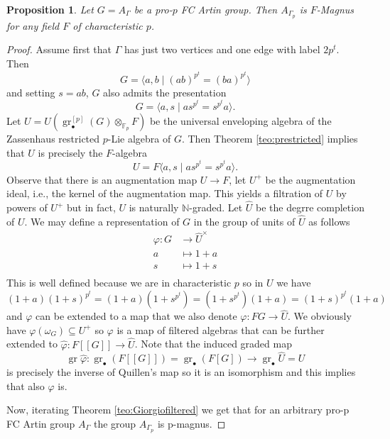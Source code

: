 \documentclass[10pt, oneside]{amsart}
\newcommand{\N}{\mathbb{N}} %
\newcommand{\F}{\mathbb{F}}
\newcommand{\gr}{\operatorname{gr}} %
\newtheorem{proposition}[theorem]{Proposition}
\theoremstyle{definition}
\theoremstyle{remark}
\theoremstyle{plain}
\begin{document}



\begin{proposition}\label{FMagnusArtin}
    Let $G=A_\Gamma$ be a pro-$p$ FC Artin group. Then $A_{\Gamma_p}$ is $F$-Magnus for any field $F$ of characteristic $p$.
\end{proposition}
\begin{proof}  Assume first that $\Gamma$ has just two vertices and one edge with label $2p^t$. Then
$$G=\langle a,b\mid (ab)^{p^t}=(ba)^{p^t}\rangle$$
and setting $s=ab$, $G$ also admits the presentation
$$G=\langle a,s\mid as^{p^t}=s^{p^t}a\rangle.$$
Let $U=U(\gr^{[p]}_\bullet(G)\otimes_{\F_p}F)$ be the universal enveloping algebra of the Zassenhaus restricted $p$-Lie algebra of $G$. Then Theorem \ref{teo:prestricted} implies that $U$ is precisely the $F$-algebra
$$U=F\langle a,s\mid as^{p^t}=s^{p^t}a\rangle.$$
Observe that there is an augmentation map $U\to F$, let $U^+$ be the augmentation ideal, i.e., the kernel of the augmentation map. This yields a filtration of $U$ by powers of $U^+$ but in fact, $U$ is naturally $\N$-graded. Let $\hat{U}$ be the degrre completion of $U$. We may define a representation of $G$ in the group of units of $\hat{U}$ as follows
$$\begin{aligned}
\varphi:G&\to\hat{U}^\times\\
a&\mapsto 1+a\\
s&\mapsto 1+s\\
\end{aligned}$$
This is well defined because we are in characteristic $p$ so in $U$ we have
$$(1+a)(1+s)^{p^t}=(1+a)(1+s^{p^t})=(1+s^{p^t})(1+a)=(1+s)^{p^t}(1+a)$$
and $\varphi$ can be extended to a map that we also denote  $\varphi:FG\to\hat{U}$. We obviously have $\varphi(\omega_G)\subseteq U^+$ so $\varphi$ is a map of filtered algebras that can be further extended to
$\hat{\varphi}:F[[G]]\to\hat{U}$. Note that the induced graded map $$\gr\hat{\varphi}:\gr_\bullet(F[[G]])=\gr_\bullet(F[G])\to\gr_\bullet\hat{U}=U$$
is precisely the inverse of  Quillen's map so it is an isomorphism and this implies that also $\hat{\varphi}$ is.

Now, iterating  Theorem \ref{teo:Giorgiofiltered} we get that for an arbitrary pro-p FC Artin group $A_\Gamma$ the group $A_{\Gamma_p}$ is p-magnus.
\end{proof}
\end{document}
